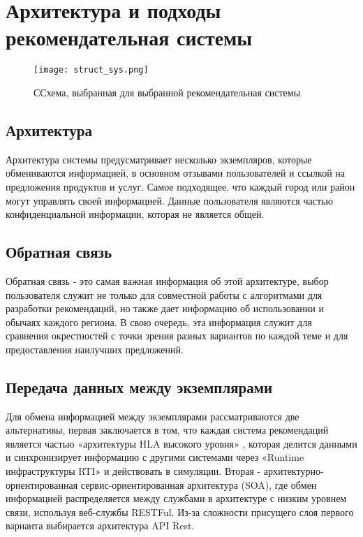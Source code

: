 \newpage
\section{Архитектура и подходы рекомендательная системы}

\begin{figure}[h]
  \centering
  \texttt{[image: struct\_sys.png]}
  \caption{ССхема, выбранная для выбранной рекомендательная системы}
  \label{image:scheme6}
\end{figure}

\subsection{Архитектура}
Архитектура системы предусматривает несколько экземпляров, которые обмениваются информацией, в основном отзывами пользователей и ссылкой на предложения продуктов и услуг. Самое подходящее, что каждый город или район могут управлять своей информацией. Данные пользователя являются частью конфиденциальной информации, которая не является общей.

\subsection{Обратная связь}
Обратная связь - это самая важная информация об этой архитектуре, выбор пользователя служит не только для совместной работы с алгоритмами для разработки рекомендаций, но также дает информацию об использовании и обычаях каждого региона. В свою очередь, эта информация служит для сравнения окрестностей с точки зрения разных вариантов по каждой теме и для предоставления наилучших предложений.

\subsection{Передача данных между экземплярами}
Для обмена информацией между экземплярами рассматриваются две альтернативы, первая заключается в том, что каждая система рекомендаций является частью «архитектуры HLA высокого уровня» \cite{hla}, которая делится данными и синхронизирует информацию с другими системами через «Runtime инфраструктуры RTI» \cite{rti} и действовать в симуляции. Вторая - архитектурно-ориентированная сервис-ориентированная архитектура (SOA), где обмен информацией распределяется между службами в архитектуре с низким уровнем связи, используя веб-службы RESTFul. Из-за сложности присущего слоя первого варианта выбирается архитектура API Rest.

